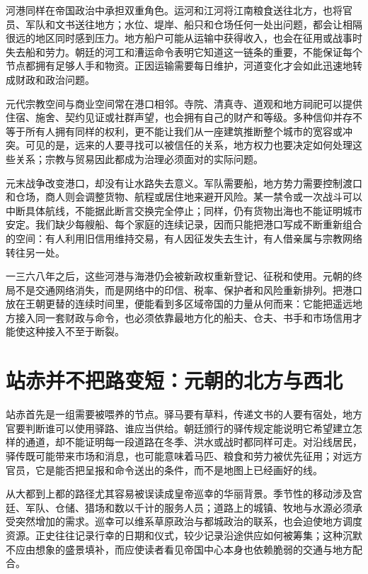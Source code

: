 河港同样在帝国政治中承担双重角色。运河和江河将江南粮食送往北方，也将官员、军队和文书送往地方；水位、堤岸、船只和仓场任何一处出问题，都会让相隔很远的地区同时感到压力。地方船户可能从运输中获得收入，也会在征用或战事时失去船和劳力。朝廷的河工和漕运命令表明它知道这一链条的重要，不能保证每个节点都拥有足够人手和物资。正因运输需要每日维护，河道变化才会如此迅速地转成财政和政治问题。

元代宗教空间与商业空间常在港口相邻。寺院、清真寺、道观和地方祠祀可以提供住宿、施舍、契约见证或社群声望，也会拥有自己的财产和等级。多种信仰并存不等于所有人拥有同样的权利，更不能让我们从一座建筑推断整个城市的宽容或冲突。可见的是，远来的人要寻找可以被信任的关系，地方权力也要决定如何处理这些关系；宗教与贸易因此都成为治理必须面对的实际问题。

元末战争改变港口，却没有让水路失去意义。军队需要船，地方势力需要控制渡口和仓场，商人则会调整货物、航程或居住地来避开风险。某一禁令或一次战斗可以中断具体航线，不能据此断言交换完全停止；同样，仍有货物出海也不能证明城市安定。我们缺少每艘船、每个家庭的连续记录，因而只能把港口写成不断重新组合的空间：有人利用旧信用维持交易，有人因征发失去生计，有人借亲属与宗教网络转往另一处。

一三六八年之后，这些河港与海港仍会被新政权重新登记、征税和使用。元朝的终局不是交通网络消失，而是网络中的印信、税率、保护者和风险重新排列。把港口放在王朝更替的连续时间里，便能看到多区域帝国的力量从何而来：它能把遥远地方接入同一套财政与命令，也必须依靠最地方化的船夫、仓夫、书手和市场信用才能使这种接入不至于断裂。

\section{站赤并不把路变短：元朝的北方与西北}

站赤首先是一组需要被喂养的节点。驿马要有草料，传递文书的人要有宿处，地方官要判断谁可以使用驿路、谁应当供给。朝廷颁行的驿传规定能说明它希望建立怎样的通道，却不能证明每一段道路在冬季、洪水或战时都同样可走。对沿线居民，驿传既可能带来市场和消息，也可能意味着马匹、粮食和劳力被优先征用；对远方官员，它是能否把呈报和命令送出的条件，而不是地图上已经画好的线。

从大都到上都的路径尤其容易被误读成皇帝巡幸的华丽背景。季节性的移动涉及宫廷、军队、仓储、猎场和数以千计的服务人员；道路上的城镇、牧地与水源必须承受突然增加的需求。巡幸可以维系草原政治与都城政治的联系，也会迫使地方调度资源。正史往往记录行幸的日期和仪式，较少记录沿途供应如何被筹集；这种沉默不应由想象的盛景填补，而应使读者看见帝国中心本身也依赖脆弱的交通与地方配合。

